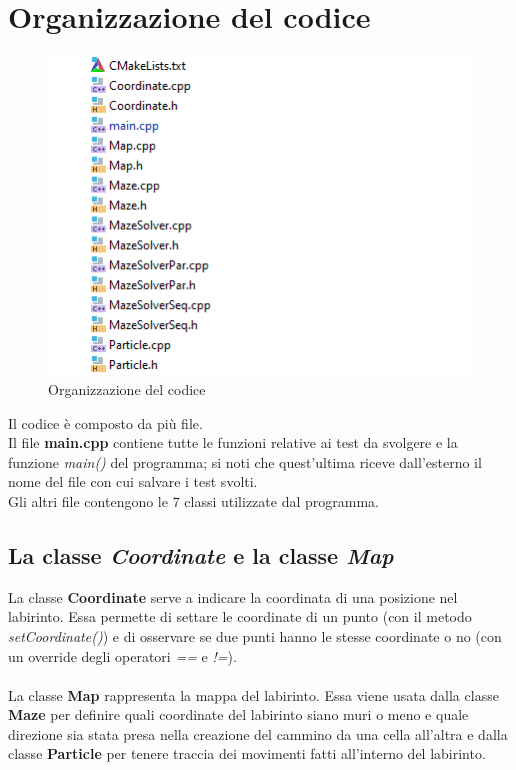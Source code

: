 \documentclass[10pt,twocolumn,letterpaper]{article}
\begin{document}
\section{Organizzazione del codice}
\begin{figure}[H]
\includegraphics[width=1\linewidth]{code/org.png}
\caption{\small Organizzazione del codice}
\label{organizzazione}
\end{figure}
Il codice è composto da più file.\\
Il file \textbf{main.cpp} contiene tutte le funzioni relative ai test da svolgere e la funzione \textit{main()} del programma; si noti che quest'ultima riceve dall'esterno il nome del file con cui salvare i test svolti.\\
Gli altri file contengono le 7 classi utilizzate dal programma.

\subsection{La classe \textit{Coordinate} e la classe \textit{Map}}
La classe \textbf{Coordinate} serve a indicare la coordinata di una posizione nel labirinto. Essa permette di settare le coordinate di un punto (con il metodo \textit{setCoordinate()}) e di osservare se due punti hanno le stesse coordinate o no (con un override degli operatori \textit{==} e \textit{!=}).\\
\\
La classe \textbf{Map} rappresenta la mappa del labirinto. Essa viene usata dalla classe \textbf{Maze} per definire quali coordinate del labirinto siano muri o meno e quale direzione sia stata presa nella creazione del cammino da una cella all'altra e dalla classe \textbf{Particle} per tenere traccia dei movimenti fatti all'interno del labirinto.
\end{document}
